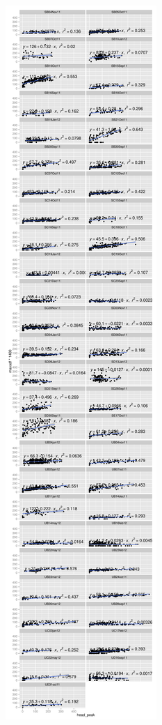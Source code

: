 \documentclass[]{article}
\begin{document}
\includegraphics{ExtraFigs_files/figure-latex/peakAnalysis-1.pdf}
\end{document}

